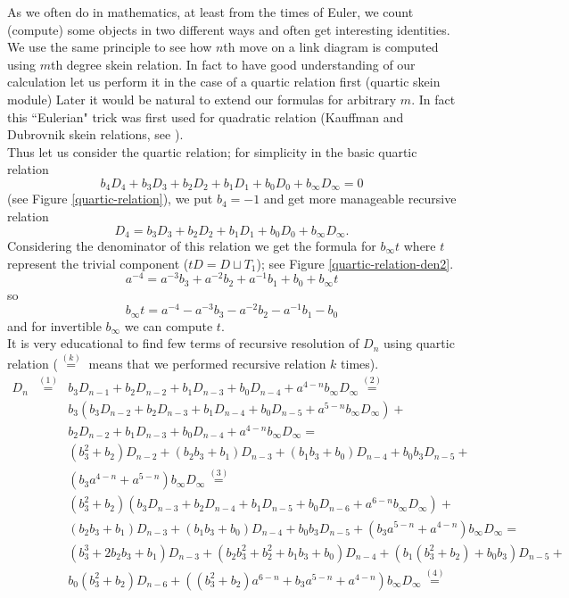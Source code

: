 \documentclass[12pt]{amsart}
\begin{document}
As we often do in mathematics, at least from the times of Euler, we count (compute) some objects in two different ways and often get interesting identities. We use the same principle to see how $n$th move on a link diagram is computed using  $m$th degree skein relation. 
In fact to have good understanding of our calculation let us perform it 
in the case of a quartic relation first (quartic skein module)
Later it would be natural to extend our formulas for arbitrary $m$. In fact this ``Eulerian" trick was first used for quadratic relation (Kauffman and Dubrovnik skein relations, see \cite{Prz1,DIP}). \\
Thus let us consider the quartic relation; for simplicity in the basic quartic relation
\begin{equation*}
b_4D_4+b_3D_3+b_2D_2+b_1D_1+b_0D_0+ b_\infty D_{\infty}=0
\end{equation*}
(see Figure \ref{quartic-relation}), we put $b_4=-1$ and
get more manageable recursive relation $$D_4=b_3D_3+b_2D_2+b_1D_1+b_0D_0+ b_\infty D_{\infty}.$$
Considering the denominator of this relation we get the formula for $b_\infty t$ where $t$ represent the trivial component ($tD = D\sqcup T_1$); see Figure \ref{quartic-relation-den2}.
$$a^{-4}=a^{-3}b_3+a^{-2}b_2+ a^{-1}b_1+b_0+b_\infty t$$
so
\begin{equation}\label{t-formula}
b_\infty t= a^{-4}-a^{-3}b_3 - a^{-2}b_2- a^{-1}b_1-b_0
\end{equation}
and for invertible $b_\infty$ we can compute $t$.\\
It is very educational to find few terms of recursive resolution 
of $D_n$ using quartic relation ($\stackrel{(k)}{=} $ means that we performed  recursive relation $k$ times).
\begin{eqnarray*}
D_n&\stackrel{(1)}{=}& b_3D_{n-1}+b_2D_{n-2}+b_1D_{n-3}+b_0D_{n-4}+ a^{4-n}b_{\infty}D_{\infty} \stackrel{(2)}{=}\\
&&b_3(b_3D_{n-2}+b_2D_{n-3}+b_1D_{n-4}+b_0D_{n-5}+ a^{5-n}b_{\infty}D_{\infty})+\\
&&b_2D_{n-2}+b_1D_{n-3}+b_0D_{n-4}+ a^{4-n}b_{\infty}D_{\infty}=\\
&&(b_3^2+b_2)D_{n-2}+(b_2b_3+b_1)D_{n-3}+(b_1b_3+b_0)D_{n-4}+b_0b_3D_{n-5}+\\
&&(b_3a^{4-n}+a^{5-n})b_{\infty}D_{\infty} \stackrel{(3)}{=}\\
&&(b_3^2+b_2)(b_3D_{n-3}+b_2D_{n-4}+b_1D_{n-5}+b_0D_{n-6} + a^{6-n}b_{\infty}D_{\infty})+\\
&&(b_2b_3+b_1)D_{n-3}+(b_1b_3+b_0)D_{n-4} + b_0b_3D_{n-5}+
(b_3a^{5-n}+a^{4-n})b_{\infty}D_{\infty}=\\
&&(b_3^3+2b_2b_3+b_1)D_{n-3}+(b_2b_3^2+b_2^2+b_1b_3+b_0)D_{n-4}+(b_1(b_3^2+b_2)+b_0b_3)D_{n-5}+\\
&&b_0(b_3^2+b_2)D_{n-6}+ ((b_3^2+b_2)a^{6-n}+b_3a^{5-n}+a^{4-n})b_{\infty}D_{\infty}\stackrel{(4)}{=}
\end{eqnarray*}
\end{document}
